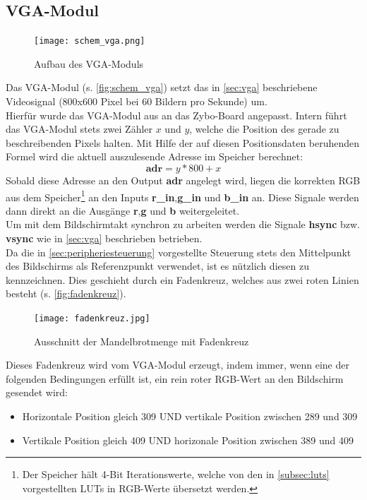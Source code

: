 \documentclass[a4paper,12pt,onesided]{report}
\begin{document}
\subsection{VGA-Modul}
\label{subsec:vga-modul}
\begin{figure}[H]
	\centering
	\texttt{[image: schem\_vga.png]}
	\caption{Aufbau des VGA-Moduls}
	\label{fig:schem_vga}
\end{figure}
Das VGA-Modul (s. \autoref{fig:schem_vga}) setzt das in \autoref{sec:vga} beschriebene Videosignal (800x600 Pixel bei 60 Bildern pro Sekunde) um.\\
Hierfür wurde das VGA-Modul aus \cite{vgagit} an das Zybo-Board angepasst.
Intern führt das VGA-Modul stets zwei Zähler $x$ und $y$, welche die Position des gerade zu beschreibenden Pixels halten.
Mit Hilfe der auf diesen Positionsdaten beruhenden Formel wird die aktuell auszulesende Adresse im Speicher berechnet:
\[\mathbf{adr}= y*800+ x\]
Sobald diese Adresse an den Output \textbf{adr} angelegt wird, liegen die korrekten RGB aus dem Speicher\footnote{Der Speicher hält 4-Bit Iterationswerte, welche von den in \autoref{subsec:luts} vorgestellten LUTs in RGB-Werte übersetzt werden.} an den Inputs \textbf{r\_in},\textbf{g\_in} und \textbf{b\_in} an.
Diese Signale werden dann direkt an die Ausgänge \textbf{r},\textbf{g} und \textbf{b} weitergeleitet.\\
Um mit dem Bildschirmtakt synchron zu arbeiten werden die Signale \textbf{hsync} bzw. \textbf{vsync} wie in \autoref{sec:vga} beschrieben betrieben.\\
Da die in \autoref{sec:peripheriesteuerung} vorgestellte Steuerung stets den Mittelpunkt des Bildschirms als Referenzpunkt verwendet, ist es nützlich diesen zu kennzeichnen.
Dies geschieht durch ein Fadenkreuz, welches aus zwei roten Linien besteht (s. \autoref{fig:fadenkreuz}).
\begin{figure}[H]
	\centering
	\texttt{[image: fadenkreuz.jpg]}
	\caption{Ausschnitt der Mandelbrotmenge mit Fadenkreuz}
	\label{fig:fadenkreuz}
\end{figure}
Dieses Fadenkreuz wird vom VGA-Modul erzeugt, indem immer, wenn eine der folgenden Bedingungen erfüllt ist, ein rein roter RGB-Wert an den Bildschirm gesendet wird:
\begin{itemize}
	\item Horizontale Position gleich 309 UND vertikale Position zwischen 289 und 309
	\item Vertikale Position gleich 409 UND horizonale Position zwischen 389 und 409
\end{itemize}
\end{document}
